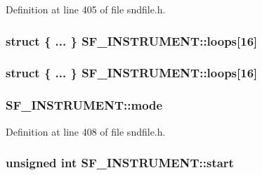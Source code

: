 Definition at line 405 of file sndfile.\+h.

\subsubsection[{\texorpdfstring{loops}{loops}}]{\setlength{\rightskip}{0pt plus 5cm}struct \{ ... \}   S\+F\+\_\+\+I\+N\+S\+T\+R\+U\+M\+E\+N\+T\+::loops\mbox{[}16\mbox{]}}\hypertarget{struct_s_f___i_n_s_t_r_u_m_e_n_t_a4972c8c72d790efa52c6e4982338e7af}{}\label{struct_s_f___i_n_s_t_r_u_m_e_n_t_a4972c8c72d790efa52c6e4982338e7af}
\subsubsection[{\texorpdfstring{loops}{loops}}]{\setlength{\rightskip}{0pt plus 5cm}struct \{ ... \}   S\+F\+\_\+\+I\+N\+S\+T\+R\+U\+M\+E\+N\+T\+::loops\mbox{[}16\mbox{]}}\hypertarget{struct_s_f___i_n_s_t_r_u_m_e_n_t_a25418774ca66b71c4ad29dd5070434da}{}\label{struct_s_f___i_n_s_t_r_u_m_e_n_t_a25418774ca66b71c4ad29dd5070434da}
\subsubsection[{\texorpdfstring{mode}{mode}}]{ S\+F\+\_\+\+I\+N\+S\+T\+R\+U\+M\+E\+N\+T\+::mode}\hypertarget{struct_s_f___i_n_s_t_r_u_m_e_n_t_af222d1a939525fe44aa377ff764570be}{}\label{struct_s_f___i_n_s_t_r_u_m_e_n_t_af222d1a939525fe44aa377ff764570be}


Definition at line 408 of file sndfile.\+h.

\subsubsection[{\texorpdfstring{start}{start}}]{\setlength{\rightskip}{0pt plus 5cm}unsigned {\bf int} S\+F\+\_\+\+I\+N\+S\+T\+R\+U\+M\+E\+N\+T\+::start}\hypertarget{struct_s_f___i_n_s_t_r_u_m_e_n_t_a4053f5d0ec83a281264dfd9c17ae921c}{}\label{struct_s_f___i_n_s_t_r_u_m_e_n_t_a4053f5d0ec83a281264dfd9c17ae921c}


